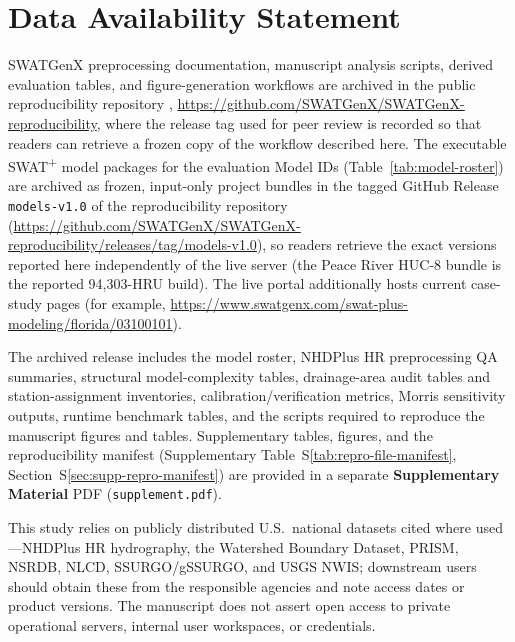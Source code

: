 \section*{Data Availability Statement}

\begin{sloppypar}
SWATGenX preprocessing documentation, manuscript analysis scripts, derived evaluation tables, and figure-generation workflows are archived in the public reproducibility repository \citep{RafieiSWATGenXrepro}, \url{https://github.com/SWATGenX/SWATGenX-reproducibility}, where the release tag used for peer review is recorded so that readers can retrieve a frozen copy of the workflow described here.
The executable SWAT\textsuperscript{+} model packages for the evaluation Model IDs (Table~\ref{tab:model-roster}) are archived as frozen, input-only project bundles in the tagged GitHub Release \texttt{models-v1.0} of the reproducibility repository (\url{https://github.com/SWATGenX/SWATGenX-reproducibility/releases/tag/models-v1.0}), so readers retrieve the exact versions reported here independently of the live server (the Peace River HUC-8 bundle is the reported 94{,}303-HRU build). The live portal additionally hosts current case-study pages (for example, \url{https://www.swatgenx.com/swat-plus-modeling/florida/03100101}).

The archived release includes the model roster, NHDPlus HR preprocessing QA summaries, structural model-complexity tables, drainage-area audit tables and station-assignment inventories, calibration/verification metrics, Morris sensitivity outputs, runtime benchmark tables, and the scripts required to reproduce the manuscript figures and tables. Supplementary tables, figures, and the reproducibility manifest (Supplementary Table~S\ref{tab:repro-file-manifest}, Section~S\ref{sec:supp-repro-manifest}) are provided in a separate \textbf{Supplementary Material} PDF (\texttt{supplement.pdf}).

This study relies on publicly distributed U.S.\ national datasets cited where used---NHDPlus HR hydrography, the Watershed Boundary Dataset, PRISM, NSRDB, NLCD, SSURGO/gSSURGO, and USGS NWIS; downstream users should obtain these from the responsible agencies and note access dates or product versions. The manuscript does not assert open access to private operational servers, internal user workspaces, or credentials.
\end{sloppypar}
